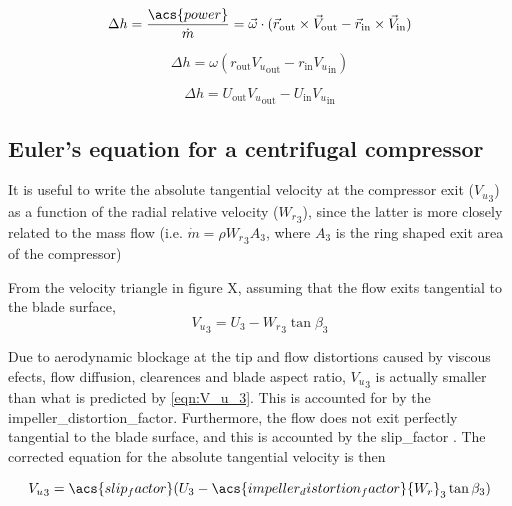 \documentclass[tcc]{subfiles}
\begin{document}
\begin{equation}
    \Delta h = \frac{\acs{power}}{\dot{m}} 
             = \vec{\omega} \cdot (\vec{r}_{\text{out}}\cross\vec{V}_{\text{out}} - \vec{r}_{\text{in}}\cross\vec{V}_{\text{in}}) 
\end{equation}

\begin{equation}
    \Delta h = \omega (r_{\text{out}} {V_u}_{\text{out}} - r_{\text{in}} {V_u}_{\text{in}}) 
\end{equation}

\begin{equation}
    \label{eqn:euler}
    \Delta h = U_{\text{out}} {V_u}_{\text{out}} - U_{\text{in}} {V_u}_{\text{in}} 
\end{equation}

\subsection{Euler's equation for a centrifugal compressor}

It is useful to write the absolute tangential velocity at the compressor exit (${V_u}_3$)
as a function of the radial relative velocity (${W_r}_3$),
since the latter is more closely related to the mass flow 
(i.e. $\dot{m} = \rho {W_r}_3 A_3$, where $A_3$ is the ring shaped exit area of the compressor)

From the velocity triangle in figure X, assuming that the flow exits tangential to the blade surface,
\begin{equation}
    \label{eqn:V_u_3}
    {V_u}_3 = U_3 - {W_r}_3 \tan\beta_3
\end{equation}

Due to aerodynamic blockage at the tip and flow distortions caused by viscous efects, flow diffusion, clearences and blade aspect ratio,
${V_u}_3$ is actually smaller than what is predicted by \cref{eqn:V_u_3}.
This is accounted for by the \acf{impeller_distortion_factor}.
Furthermore, the flow does not exit perfectly tangential to the blade surface, and this is accounted by the \acf{slip_factor} \cite{Wiesner1967,Aungier1995}.
The corrected equation for the absolute tangential velocity is then

\begin{equation}
    \label{eqn:V_u_3_corrected}
    {V_u}_3 = \acs{slip_factor}(U_3 - \acs{impeller_distortion_factor}{W_r}_3 \tan\beta_3)
\end{equation}
\end{document}
